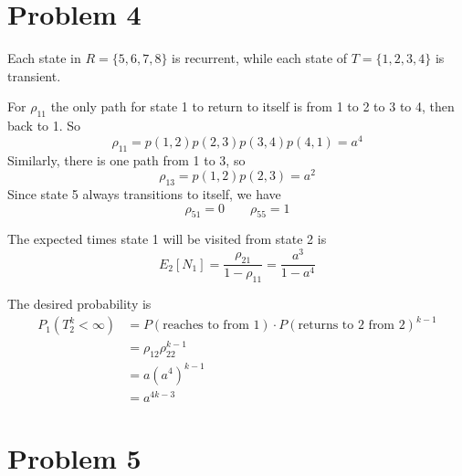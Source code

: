 \documentclass{homework}
\begin{document}
\section{Problem 4}
\begin{letterenum}
\item Each state in $R = \{5, 6, 7, 8\}$ is recurrent, while each
state of $T = \{1, 2, 3, 4\}$ is transient.

\item For $\rho_{11}$ the only path for state 1 to return to itself
is from 1 to 2 to 3 to 4, then back to 1. So
\begin{equation*}
    \rho_{11} = p(1,2)p(2,3)p(3,4)p(4,1) = a^4
\end{equation*}
Similarly, there is one path from 1 to 3, so
\begin{equation*}
    \rho_{13} = p(1, 2)p(2, 3) = a^2
\end{equation*}
Since state 5 always transitions to itself, we have
\begin{equation*}
    \rho_{51} = 0 \qquad \rho_{55} = 1
\end{equation*}

\item The expected times state 1 will be visited from state 2 is
\begin{equation*}
    E_2[N_1] = \frac{\rho_{21}}{1 - \rho_{11}} = \frac{a^3}{1 - a^4}
\end{equation*}

\item The desired probability is
\begin{align*}
    P_1(T_2^k < \infty) &= P(\text{reaches to from 1})
        \cdot P(\text{returns to 2 from 2})^{k-1} \\
        &= \rho_{12} \rho_{22}^{k-1} \\
        &= a (a^4)^{k-1} \\
        &= a^{4k-3}
\end{align*}




\end{letterenum}

\section{Problem 5}
\end{document}
